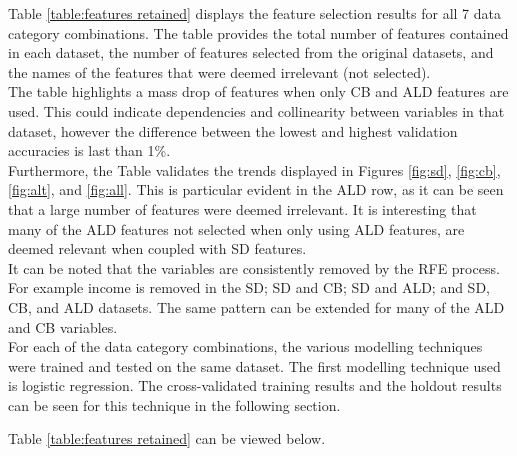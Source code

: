 Table \ref{table:features retained} displays the feature selection results for all 7 data category combinations. The table provides the total number of features contained in each dataset, the number of features selected from the original datasets, and the names of the features that were deemed irrelevant (not selected). \\

The table highlights a mass drop of features when only CB and ALD features are used. This could indicate dependencies and collinearity between variables in that dataset, however the difference between the lowest and highest validation accuracies is last than 1\%.  \\

Furthermore, the Table validates the trends displayed in Figures \ref{fig:sd}, \ref{fig:cb}, \ref{fig:alt}, and \ref{fig:all}. This is particular evident in the ALD row, as it can be seen that a large number of features were deemed irrelevant. It is interesting that many of the ALD features not selected when only using ALD features, are deemed relevant when coupled with SD features.  \\

It can be noted that the variables are consistently removed by the RFE process. For example income is removed in the SD; SD and CB; SD and ALD; and SD, CB, and ALD datasets. The same pattern can be extended for many of the ALD and CB variables. \\

For each of the data category combinations, the various modelling techniques were trained and tested on the same dataset. The first modelling technique used is logistic regression. The cross-validated training results and the holdout results can be seen for this technique in the following section. \newpage


Table \ref{table:features retained} can be viewed below. 

\vspace{10pt}

